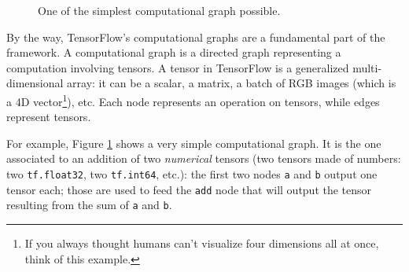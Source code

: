 \begin{figure}
  \centering
  \caption[]{One of the simplest computational graph possible.}
  \label{fig:easy-graph}
\end{figure}

By the way, TensorFlow's computational graphs are a fundamental part of
the framework. A computational graph is a directed graph representing a
computation involving tensors. A tensor in TensorFlow is a generalized
multi-dimensional array: it can be a scalar, a matrix, a batch of RGB
images (which is a 4D vector\footnote{If you always thought humans
  can't visualize four dimensions all at once, think of this
  example.}), etc. Each node represents an operation on tensors, while
edges represent tensors.

For example, Figure \ref{fig:easy-graph} shows a very simple
computational graph. It is the one associated to an addition of two
\emph{numerical} tensors (two tensors made of numbers: two
\texttt{tf.float32}, two \texttt{tf.int64}, etc.): the first two nodes
\texttt{a} and \texttt{b} output one tensor each; those are used to
feed the \texttt{add} node that will output the tensor resulting from
the sum of \texttt{a} and \texttt{b}.

